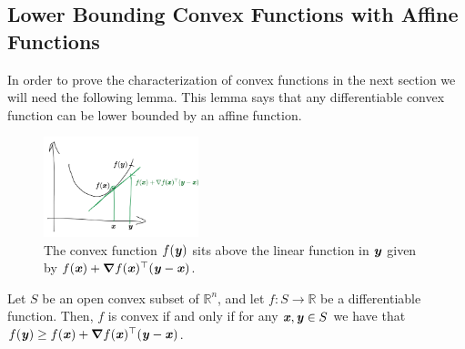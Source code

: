 
\subsection{Lower Bounding Convex Functions with Affine Functions}
In order to prove the characterization of convex functions in the next
section we will need the following lemma.  This lemma says that any
differentiable convex function can be lower bounded by an affine function.


\begin{figure}[h]
  \centering
  \includegraphics[width=0.4\textwidth]{fig/lecture2_convex-linear-lb.png}
\caption{The convex function $f(\boldsymbol{\mathit{y}})$ sits above the linear function
  in $\boldsymbol{\mathit{y}}$ given by
  ${f(\boldsymbol{\mathit{x}}) + \boldsymbol{\nabla} f(\boldsymbol{\mathit{x}})^\top  (\boldsymbol{\mathit{y}}-\boldsymbol{\mathit{x}})}$.}
\label{fig:nonjointconvex}
\end{figure}
%

\begin{theorem}\label{thm:convexlb}
Let  $S$ be an open convex subset of $\mathbb{R}^n$, and
let $f:S\to \mathbb{R}$ be a  differentiable function.
Then, $f$ is convex if and only if for any $\boldsymbol{\mathit{x}},\boldsymbol{\mathit{y}} \in S$ we have that $f(\boldsymbol{\mathit{y}}) \geq f(\boldsymbol{\mathit{x}}) + \boldsymbol{\nabla} f(\boldsymbol{\mathit{x}})^\top  (\boldsymbol{\mathit{y}}-\boldsymbol{\mathit{x}})$.
\end{theorem}

